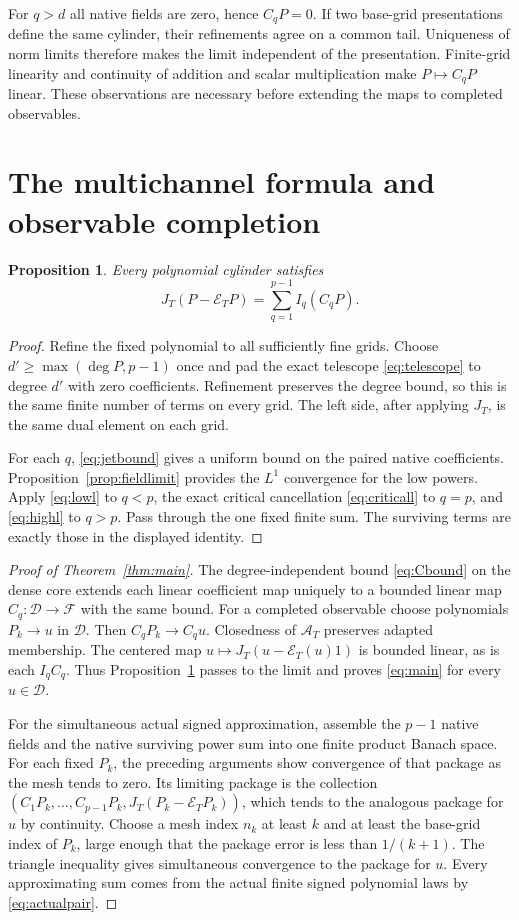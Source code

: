 \documentclass[11pt]{article}
\newtheorem{proposition}[theorem]{Proposition}
\theoremstyle{remark}\newtheorem{remark}[theorem]{Remark}
\newcommand{\D}{\mathcal D}\newcommand{\E}{\mathcal E}
\begin{document}
For $q>d$ all native fields are zero, hence $C_qP=0$.
If two base-grid presentations define the same cylinder, their
refinements agree on a common tail. Uniqueness of norm limits
therefore makes the limit independent of the presentation.
Finite-grid linearity and continuity of addition and scalar
multiplication make $P\mapsto C_qP$ linear. These observations
are necessary before extending the maps to completed observables.

\section{The multichannel formula and observable completion}
\begin{proposition}\label{prop:polyformula}
Every polynomial cylinder satisfies
\[
 J_T(P-\E_TP)=\sum_{q=1}^{p-1}I_q(C_qP).
\]
\end{proposition}
\begin{proof}
Refine the fixed polynomial to all sufficiently fine grids.
Choose $d'\geq\max(\deg P,p-1)$ once and pad the exact telescope
\eqref{eq:telescope} to degree $d'$ with zero coefficients.
Refinement preserves the degree bound, so this is the same finite
number of terms on every grid. The left side, after applying
$J_T$, is the same dual element on each grid.

For each $q$, \eqref{eq:jetbound} gives a uniform bound on the
paired native coefficients. Proposition~\ref{prop:fieldlimit}
provides the $L^1$ convergence for the low powers.
Apply \eqref{eq:lowl} to $q<p$, the exact critical cancellation
\eqref{eq:criticall} to $q=p$, and \eqref{eq:highl} to $q>p$.
Pass through the one fixed finite sum. The surviving terms are
exactly those in the displayed identity.
\end{proof}

\begin{proof}[Proof of Theorem~\ref{thm:main}]
The degree-independent bound \eqref{eq:Cbound} on the dense core
extends each linear coefficient map uniquely to a bounded linear
map $C_q:\D\to\mathcal F$ with the same bound. For a completed
observable choose polynomials $P_k\to u$ in $\D$.
Then $C_qP_k\to C_qu$. Closedness of $\mathcal A_T$ preserves
adapted membership. The centered map
$u\mapsto J_T(u-\E_T(u)1)$ is bounded linear, as is each $I_qC_q$.
Thus Proposition~\ref{prop:polyformula} passes to the limit and
proves \eqref{eq:main} for every $u\in\D$.

For the simultaneous actual signed approximation, assemble the
$p-1$ native fields and the native surviving power sum into one
finite product Banach space. For each fixed $P_k$, the preceding
arguments show convergence of that package as the mesh tends
to zero. Its limiting package is the collection
$(C_1P_k,\ldots,C_{p-1}P_k,J_T(P_k-\E_TP_k))$,
which tends to the analogous package for $u$ by continuity.
Choose a mesh index $n_k$ at least $k$ and at least the base-grid
index of $P_k$, large enough that the package error is less than
$1/(k+1)$. The triangle inequality gives simultaneous convergence
to the package for $u$. Every approximating sum comes from the
actual finite signed polynomial laws by \eqref{eq:actualpair}.
\end{proof}
\end{document}

